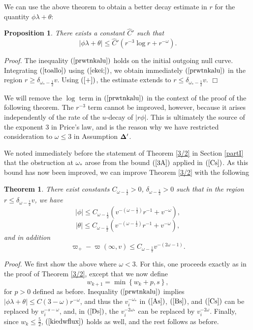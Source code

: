 \documentclass{article}
\newtheorem{theorem}{Theorem}[section]
\newtheorem{proposition}{Proposition}[section]
\begin{document}
We can use the above theorem
to obtain a better decay estimate in $r$ for the quantity $\phi\lambda+\theta$:
\begin{proposition}
There exists 
a constant $\hat{C}'$ such that
\begin{equation}
\label{prwtnkalu}
|\phi\lambda+\theta|\le \hat{C}'(r^{-3}\log r+r^{-\omega}).
\end{equation}
\end{proposition}

\noindent\emph{Proof.}
The inequality $(\ref{prwtnkalu})$ holds on the initial outgoing null curve.
Integrating $(\ref{toallo})$ using $(\ref{ekei;})$,
we obtain immediately $(\ref{prwtnkalu})$ in the region
$r\ge\delta_{\omega_*-\frac12} v$. Using $(\ref{+})$, 
the estimate extends to $r\le\delta_{\omega_*-\frac12}v$. $\Box$

We will remove the $\log$ term in $(\ref{prwtnkalu})$ in the
context of the proof of the following theorem. The $r^{-3}$ term
cannot be improved, however, because it arises independently of
the rate of the $u$-decay of $|r\phi|$. This is ultimately the source of the
exponent $3$ in Price's law, and is the reason why we have restricted
consideration to $\omega\le 3$ in Assumption ${\bf \Delta}'$.

We noted immediately before the statement of Theorem \ref{3/2} in
Section \ref{partI} that the obstruction at $\omega_*$ arose 
from the bound $(\ref{3A})$ applied in $(\ref{Cs})$.
As this bound has now been improved, we can improve Theorem \ref{3/2}
with the following

\begin{theorem}
\label{5/2}
There exist constants $C_{\omega-\frac12}>0$, $\delta_{\omega-\frac12}>0$ 
such that
in the region $r\le\delta_{\omega-\frac12} v$, we have
\[
|\phi|\le C_{\omega-\frac12}\left(v^{-\left(\omega-\frac12\right)}r^{-1}+
v^{-\omega}\right),
\]
\[
|\theta|\le C_{\omega-\frac12}\left(v^{-\left(\omega-\frac12\right)}r^{-1}+
v^{-\omega}\right),
\]
and in addition
\[
\varpi_+-\varpi(\infty,v)
\le C_{\omega-\frac12}v^{-(2\omega-1)}.
\]
\end{theorem}

\noindent\emph{Proof.}
We first show the above where $\omega<3$.
For this, one proceeds exactly as in the proof of Theorem \ref{3/2}, except that we now
define 
\[
w_{k+1}=\min\left\{w_k+p,s\right\},
\]
for $p>0$ defined as before.
Inequality $(\ref{prwtnkalu})$ implies 
$|\phi\lambda+\theta|\le C(3-\omega)r^{-\omega}$,
and thus the $v_i^{-\omega_*}$ in $(\ref{As})$, $(\ref{Bs})$, and
$(\ref{Cs})$ can be replaced by $v_i^{-s-\omega}$, and, in $(\ref{Ds})$,
the $v_i^{-2\omega_*}$ can be replaced by $v_i^{-2\omega}$. 
Finally, since $w_k\le \frac52$,
$(\ref{kiedwflux})$ holds as well,
and the rest follows as before.
\end{document}
